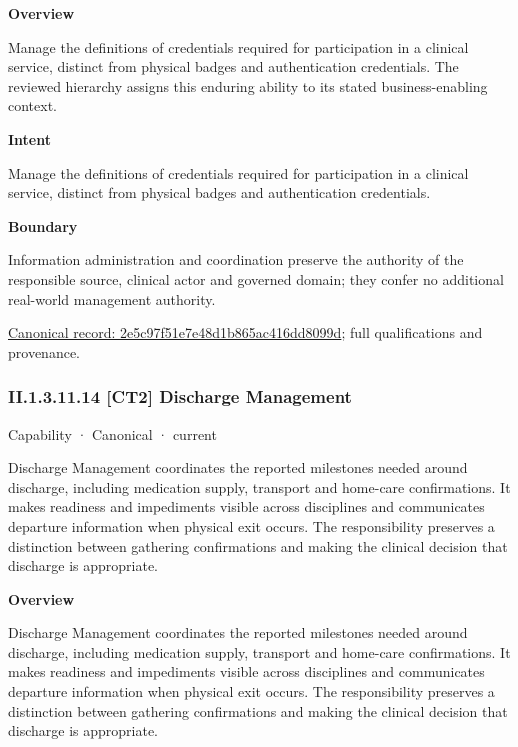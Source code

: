 \textbf{Overview}



Manage the definitions of credentials required for participation in a clinical service, distinct from physical badges and authentication credentials. The reviewed hierarchy assigns this enduring ability to its stated business-enabling context.



\textbf{Intent}



Manage the definitions of credentials required for participation in a clinical service, distinct from physical badges and authentication credentials.



\textbf{Boundary}



Information administration and coordination preserve the authority of the responsible source, clinical actor and governed domain; they confer no additional real-world management authority.


{\footnotesize \href{../../../../continuum/strategy/capability/2e5c97f51e7e48d1b865ac416dd8099d.md}{Canonical record: 2e5c97f51e7e48d1b865ac416dd8099d}; full qualifications and provenance.}\par
\subsubsection*{II.1.3.11.14 [CT2] Discharge Management}
\label{navigation:II.1.3.11.14}

\label{element:ec5e8d6732764aa489c2dd7630fc8fef}
{\small Capability · Canonical · current}\par

Discharge Management coordinates the reported milestones needed around discharge, including medication supply, transport and home-care confirmations. It makes readiness and impediments visible across disciplines and communicates departure information when physical exit occurs. The responsibility preserves a distinction between gathering confirmations and making the clinical decision that discharge is appropriate.



\textbf{Overview}



Discharge Management coordinates the reported milestones needed around discharge, including medication supply, transport and home-care confirmations. It makes readiness and impediments visible across disciplines and communicates departure information when physical exit occurs. The responsibility preserves a distinction between gathering confirmations and making the clinical decision that discharge is appropriate.



